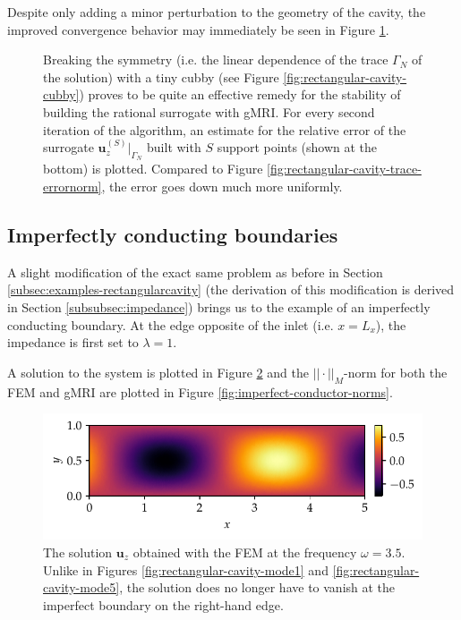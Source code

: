 \documentclass[11pt, a4paper]{article}
\begin{document}
Despite only adding a minor perturbation to the geometry of the cavity, the improved
convergence behavior may immediately be seen in Figure \ref{fig:rectangular-cubby-trace-errornorm}.

\begin{figure}[ht]
    \centering
    
    \caption{Breaking the symmetry (i.e. the linear dependence of the trace
    $\Gamma_N$ of the solution) with a tiny cubby (see Figure \ref{fig:rectangular-cavity-cubby})
    proves to be quite an effective remedy for the stability of building the
    rational surrogate with \acrshort{gMRI}. For every second iteration of the 
    algorithm, an estimate for the relative error of the surrogate $\mathbf{u}_z^{(S)}|_{\Gamma_N}$
    built with $S$ support points (shown at the bottom) is plotted. Compared to
    Figure \ref{fig:rectangular-cavity-trace-errornorm}, the error goes down much
    more uniformly.}
    \label{fig:rectangular-cubby-trace-errornorm}
\end{figure}

\clearpage
\subsection{Imperfectly conducting boundaries}
\label{subsec:examples-impedance}

A slight modification of the exact same problem as before in Section
\ref{subsec:examples-rectangularcavity} (the derivation of this modification
is derived in Section \ref{subsubsec:impedance})
brings us to the example of an imperfectly conducting boundary. At the edge 
opposite of the inlet (i.e. $x=L_x$), the impedance is first set to $\lambda=1$.

A solution to the system is plotted in Figure \ref{fig:imperfect-conductor-solution}
and the $||\cdot||_M$-norm for both the \acrshort{FEM} and \acrshort{gMRI}
are plotted in Figure \ref{fig:imperfect-conductor-norms}.

\begin{figure}[ht]
    \centering
    \includegraphics{plots/imperfect_conductor_solution.pdf}
    \caption{The solution $\mathbf{u}_z$ obtained with the \acrshort{FEM} at the
    frequency $\omega = 3.5$. Unlike in Figures \ref{fig:rectangular-cavity-mode1}
    and \ref{fig:rectangular-cavity-mode5}, the solution does no longer have to
    vanish at the imperfect boundary on the right-hand edge.}
    \label{fig:imperfect-conductor-solution}
\end{figure}
\end{document}
